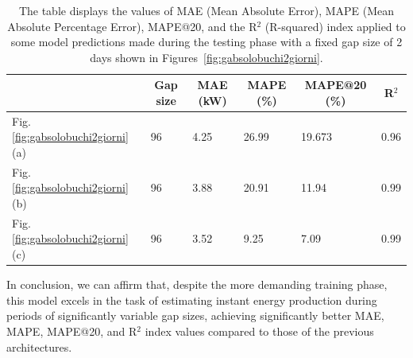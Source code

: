 \begin{table}[H]
	\begin{center}
		\begin{tabular}[c]{l|l|l|l|l|l}
			                                           &
			\multicolumn{1}{c|}{\textbf{Gap size}}     &
			\multicolumn{1}{c|}{\textbf{MAE (kW)}}     &
			\multicolumn{1}{c|}{\textbf{MAPE (\%)}}    &                                   %
			\multicolumn{1}{c|}{\textbf{MAPE@20 (\%)}} &                                   %
			\multicolumn{1}{c}{\textbf{R}$^2$}                                             \\
			\hline

			Fig. \ref{fig:gabsolobuchi2giorni}(a)      & 96 & 4.25 & 26.99 & 19.673 & 0.96 \\
			Fig. \ref{fig:gabsolobuchi2giorni}(b)      & 96 & 3.88 & 20.91 & 11.94  & 0.99 \\
			Fig. \ref{fig:gabsolobuchi2giorni}(c)      & 96 & 3.52 & 9.25  & 7.09   & 0.99
		\end{tabular}
	\end{center}
	\caption{The table displays the values of MAE (Mean Absolute Error), MAPE (Mean Absolute Percentage Error), MAPE@20, and the R$^2$ (R-squared) index applied to some model predictions made during the testing phase with a fixed gap size of 2 days shown in Figures~\ref{fig:gabsolobuchi2giorni}.}
\end{table}

In conclusion, we can affirm that, despite the more demanding training phase, this model excels in the task of estimating instant energy production during periods of significantly variable gap sizes, achieving significantly better MAE, MAPE, MAPE@20, and R$^2$ index values compared to those of the previous architectures.

